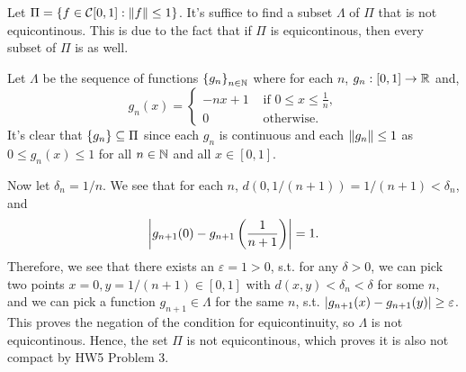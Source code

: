 \documentclass[12pt]{article}
\begin{document}
\begin{fproof}[1(b)]
Let \(\Pi = \left\{ f \in \mathcal{C}[0,1]: \left\lVert f \right\rVert \leq 1 \right\}\).
It's suffice to find a subset \(\Lambda\) of \(\Pi\) that is not equicontinous.
This is due to the fact that if \(\Pi\) is equicontinous, then every subset of \(\Pi\) is as well.

Let \(\Lambda\) be the sequence of functions \(\left\{ g_n \right\}_{n \in \mathbb {N}}\) where for each \(n\), \(g_n:[0,1] \to \mathbb {R}\) and,
\[
    g_n(x) =
\begin{cases}
    -nx + 1 & \text{ if } 0 \leq x \leq \frac{1}{n},\\
    0 & \text{ otherwise}.
\end{cases}
\]
It's clear that \(\left\{ g_n \right\} \subseteq \Pi\) since each \(g_n\) is continuous and each \(\left\lVert g_n \right\rVert \leq 1\) as \(0 \leq g_n(x) \leq 1\) for all \(n \in \mathbb {N}\) and all \(x \in [0,1]\).

Now let \(\delta_n = 1/n\).
We see that for each \(n\),
\(d(0, 1/(n+1)) = 1/(n+1) < \delta_n\), and
\begin{align*}
    \left\lvert g_{n+1}(0) - g_{n+1}\left( \frac{1}{n+1} \right) \right\rvert = 1.
\end{align*}
Therefore, we see that there exists an \(\varepsilon = 1 > 0\), s.t. for any \(\delta > 0\),
we can pick two points \(x=0, y=1/(n+1) \in [0,1]\) with \(d(x, y) < \delta_n < \delta\) for some \(n\), and we can pick a function \(g_{n+1} \in \Lambda\) for the same \(n\), s.t. \(\left\lvert g_{n+1}(x) - g_{n+1}(y) \right\rvert \geq \varepsilon\).
This proves the negation of the condition for equicontinuity, so \(\Lambda\) is not equicontinous. Hence, the set \(\Pi\) is not equicontinous, which proves it is also not compact by HW5 Problem 3.

\end{fproof}
\newpage
\end{document}
